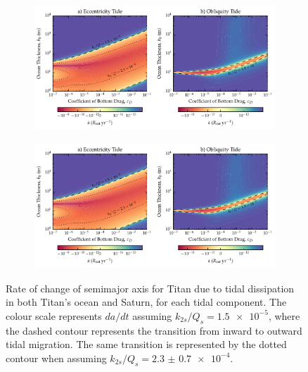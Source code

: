 \begin{figure}[!b]
    \centering
    \begin{subfigure}[t]{0.95\linewidth} %
        \includegraphics[width=\linewidth]{Figures/titan_adot}
        \label{fig:a_evo_ecc}
    \end{subfigure}
    \begin{subfigure}[t]{0\linewidth} %
         \includegraphics[width=\linewidth]{Figures/titan_adot}
         \label{fig:a_evo_obliq} 
    \end{subfigure}
    \vspace{-0.5cm}
\caption{Rate of change of semimajor axis for Titan due to tidal dissipation in both Titan's ocean and Saturn, for each tidal component. The colour scale represents $da/dt$ assuming $k_{2s}/Q_s = \num{1.5e-5}$, where the dashed contour represents the transition from inward to outward tidal migration. The same transition is represented by the dotted contour when assuming $k_{2s}/Q_s = \num[separate-uncertainty = true]{2.3(07)e-4}$.\label{fig:a_evo}}
\end{figure}

